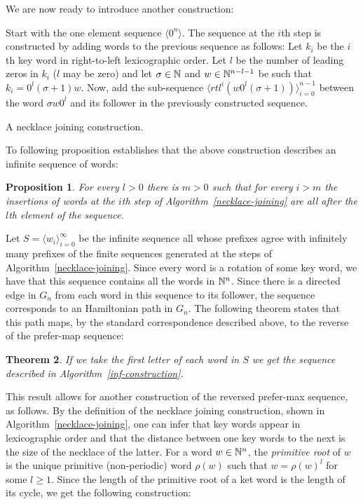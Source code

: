 \documentclass{article} %
\newtheorem{theorem}{Theorem} \newtheorem{proposition}[theorem]{Proposition}
\theoremstyle{definition} \newtheorem{definition}[theorem]{Definition}
\newcommand{\T}[1]{\langle{#1}\rangle} \newcommand{\rr}[2]{R^{#2}({#1})}
\begin{document}
	We are now ready to introduce another construction:
	
	
	\begin{algorithm}[!h] Start with the one element sequence $\T{0^n}$. The
		sequence at the $i$th step is constructed by adding words to the previous
		sequence as follows: Let $k_i$ be the $i$th key word in right-to-left
		lexicographic order. Let $l$ be the number of leading zeros in $k_i$ ($l$ may
		be zero) and let $\sigma \in {\mathbb{N}}$ and $w\in{\mathbb{N}}^{n-l-1}$ be such that
		$k_i=0^l(\sigma+1)w$. Now, add the sub-sequence
		$\T{rtl^i(w0^l(\sigma+1))}_{i=0}^{n-1}$ between the word $\sigma w 0^l$ and its
		follower in the previously constructed sequence. \caption{A necklace joining
			construction.} \label{necklace-joining} \end{algorithm}
	
	To following proposition establishes that the above construction describes an
	infinite sequence of words:
	
	\begin{proposition} For every $l>0$ there is $m>0$ such that for every $i>m$
		the insertions of words at the $i$th step of Algorithm~\ref{necklace-joining}
		are all after the $l$th element of the sequence. \end{proposition}
	
	Let $S=\T{w_i}_{i=0}^\infty$ be the infinite sequence all whose prefixes agree
	with infinitely many prefixes of the finite sequences generated at the steps of
	Algorithm~\ref{necklace-joining}. Since every word is a rotation of some key
	word, we have that this sequence contains all the words in ${\mathbb{N}}^n$. Since there
	is a directed edge in $G_n$ from each word in this sequence to its follower,
	the sequence corresponds to an Hamiltonian path in $G_n$. The following theorem
	states that this path maps, by the standard correspondence described above, to
	the reverse of the prefer-map sequence:
	
	\begin{theorem} If we take the first letter of each word in $S$ we get the
		sequence described in Algorithm~\ref{inf-construction}. \end{theorem}
	
	This result allows for another construction of the reversed prefer-max
	sequence, as follows. By the definition of the necklace joining construction,
	shown in Algorithm~\ref{necklace-joining}, one can infer that key words appear
	in lexicographic order and that the distance between one key words to the next
	is the size of the necklace of the latter. For a word $w\in{\mathbb{N}}^n$, the
	\emph{primitive root} of $w$ is the  unique primitive (non-periodic) word
	$\rho(w)$ such that $w = \rho(w)^l$ for some $l \geq 1$. Since the length of
	the primitive root of a ket word is the length of its cycle, we get the
	following construction:
	
\end{document}
